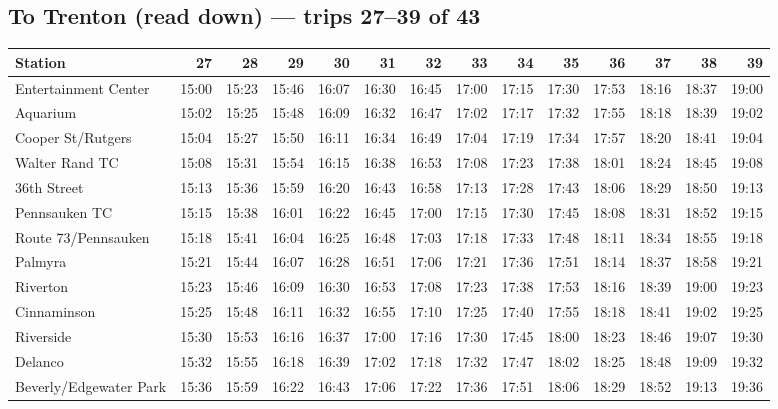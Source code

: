 \subsection*{To Trenton (read down) --- trips 27--39 of 43}
\begin{center}\footnotesize\setlength{\tabcolsep}{3pt}\begin{tabular}{@{}lrrrrrrrrrrrrr@{}}\toprule
Station & 27 & 28 & 29 & 30 & 31 & 32 & 33 & 34 & 35 & 36 & 37 & 38 & 39 \\\midrule
Entertainment Center & 15:00 & 15:23 & 15:46 & 16:07 & 16:30 & 16:45 & 17:00 & 17:15 & 17:30 & 17:53 & 18:16 & 18:37 & 19:00 \\
Aquarium & 15:02 & 15:25 & 15:48 & 16:09 & 16:32 & 16:47 & 17:02 & 17:17 & 17:32 & 17:55 & 18:18 & 18:39 & 19:02 \\
Cooper St/Rutgers & 15:04 & 15:27 & 15:50 & 16:11 & 16:34 & 16:49 & 17:04 & 17:19 & 17:34 & 17:57 & 18:20 & 18:41 & 19:04 \\
Walter Rand TC & 15:08 & 15:31 & 15:54 & 16:15 & 16:38 & 16:53 & 17:08 & 17:23 & 17:38 & 18:01 & 18:24 & 18:45 & 19:08 \\
36th Street & 15:13 & 15:36 & 15:59 & 16:20 & 16:43 & 16:58 & 17:13 & 17:28 & 17:43 & 18:06 & 18:29 & 18:50 & 19:13 \\
Pennsauken TC & 15:15 & 15:38 & 16:01 & 16:22 & 16:45 & 17:00 & 17:15 & 17:30 & 17:45 & 18:08 & 18:31 & 18:52 & 19:15 \\
Route 73/Pennsauken & 15:18 & 15:41 & 16:04 & 16:25 & 16:48 & 17:03 & 17:18 & 17:33 & 17:48 & 18:11 & 18:34 & 18:55 & 19:18 \\
Palmyra & 15:21 & 15:44 & 16:07 & 16:28 & 16:51 & 17:06 & 17:21 & 17:36 & 17:51 & 18:14 & 18:37 & 18:58 & 19:21 \\
Riverton & 15:23 & 15:46 & 16:09 & 16:30 & 16:53 & 17:08 & 17:23 & 17:38 & 17:53 & 18:16 & 18:39 & 19:00 & 19:23 \\
Cinnaminson & 15:25 & 15:48 & 16:11 & 16:32 & 16:55 & 17:10 & 17:25 & 17:40 & 17:55 & 18:18 & 18:41 & 19:02 & 19:25 \\
Riverside & 15:30 & 15:53 & 16:16 & 16:37 & 17:00 & 17:16 & 17:30 & 17:45 & 18:00 & 18:23 & 18:46 & 19:07 & 19:30 \\
Delanco & 15:32 & 15:55 & 16:18 & 16:39 & 17:02 & 17:18 & 17:32 & 17:47 & 18:02 & 18:25 & 18:48 & 19:09 & 19:32 \\
Beverly/Edgewater Park & 15:36 & 15:59 & 16:22 & 16:43 & 17:06 & 17:22 & 17:36 & 17:51 & 18:06 & 18:29 & 18:52 & 19:13 & 19:36 \\

\end{tabular}
\end{center}
